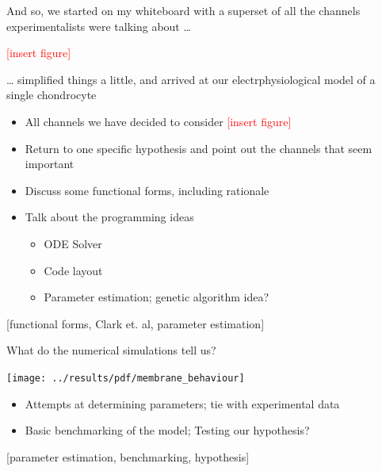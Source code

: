 \documentclass[ignorenonframetext]{beamer}
\newcommand{\references}[1] {
  \begin{flushright}
    \scriptsize [#1] \normalsize
  \end{flushright}
}
\newcommand{\addfigure} {
  \scriptsize
  \textcolor{red}{[insert figure]}
  \normalsize
}
\begin{document}

\begin{frame}{And so, we started on my whiteboard with a superset of
    all the channels experimentalists were talking about \ldots}

  \addfigure

\end{frame}

%
%

\begin{frame}{\ldots{} simplified things a little, and arrived at our
    electrphysiological model of a single chondrocyte}

  \begin{itemize}
  \item All channels we have decided to consider \addfigure %
  \item Return to one specific hypothesis and point out the channels
    that seem important %
  \item Discuss some functional forms, including rationale
  \item Talk about the programming ideas
    \begin{itemize}
      \item ODE Solver
      \item Code layout
      \item Parameter estimation; genetic algorithm idea?
    \end{itemize}
  \end{itemize}

  \references{functional forms, Clark et. al, parameter estimation}

\end{frame}

%

\begin{frame}{What do the numerical simulations tell us?}

  \texttt{[image: ../results/pdf/membrane\_behaviour]}

  \begin{itemize}
  \item Attempts at determining parameters; tie with experimental data
  \item Basic benchmarking of the model; Testing our hypothesis?
  \end{itemize}

  \references{parameter estimation, benchmarking, hypothesis}

\end{frame}
\end{document}
